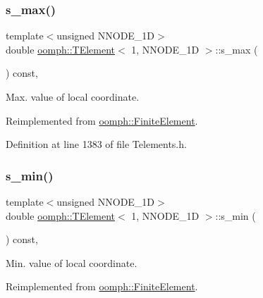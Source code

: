 \subsubsection{\texorpdfstring{s\+\_\+max()}{s\_max()}}
{\footnotesize\ttfamily template$<$unsigned N\+N\+O\+D\+E\+\_\+1D$>$ \\
double \hyperlink{classoomph_1_1TElement}{oomph\+::\+T\+Element}$<$ 1, N\+N\+O\+D\+E\+\_\+1D $>$\+::s\+\_\+max (\begin{DoxyParamCaption}{ }\end{DoxyParamCaption}) const\hspace{0.3cm}{\ttfamily [inline]}, {\ttfamily [virtual]}}



Max. value of local coordinate. 



Reimplemented from \hyperlink{classoomph_1_1FiniteElement_a64adbe9356927133686ab53f00341ea8}{oomph\+::\+Finite\+Element}.



Definition at line 1383 of file Telements.\+h.

\mbox{\label{classoomph_1_1TElement_3_011_00_01NNODE__1D_01_4_ac6477e91609fdd150e93cfeb17b3264b}} 
\subsubsection{\texorpdfstring{s\+\_\+min()}{s\_min()}}
{\footnotesize\ttfamily template$<$unsigned N\+N\+O\+D\+E\+\_\+1D$>$ \\
double \hyperlink{classoomph_1_1TElement}{oomph\+::\+T\+Element}$<$ 1, N\+N\+O\+D\+E\+\_\+1D $>$\+::s\+\_\+min (\begin{DoxyParamCaption}{ }\end{DoxyParamCaption}) const\hspace{0.3cm}{\ttfamily [inline]}, {\ttfamily [virtual]}}



Min. value of local coordinate. 



Reimplemented from \hyperlink{classoomph_1_1FiniteElement_a35f0803115b68bd162c07de04eeb6c5c}{oomph\+::\+Finite\+Element}.



